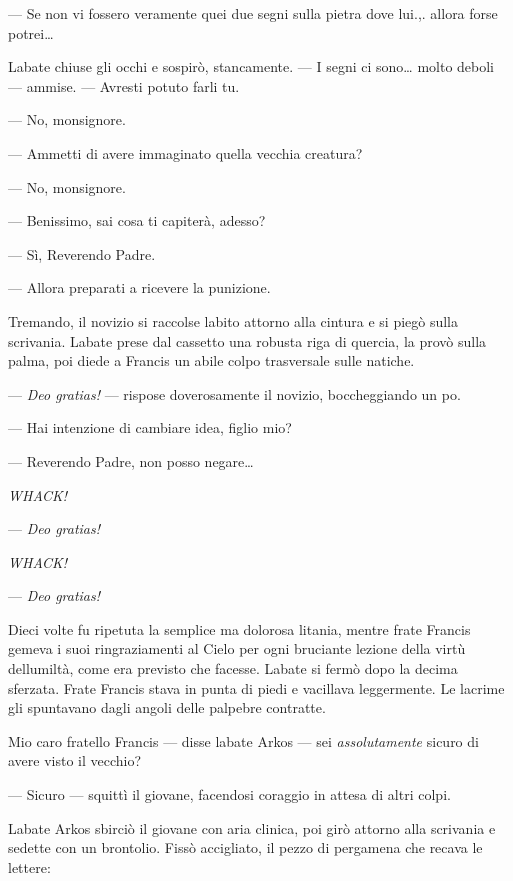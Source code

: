 --- Se non vi fossero veramente quei due segni sulla pietra dove lui.,.
allora forse potrei\ldots{}

L\textquotesingle abate chiuse gli occhi e sospirò, stancamente. --- I
segni ci sono\ldots{} molto deboli --- ammise. --- Avresti potuto farli
tu.

--- No, monsignore.

--- Ammetti di avere immaginato quella vecchia creatura?

--- No, monsignore.

--- Benissimo, sai cosa ti capiterà, adesso?

--- Sì, Reverendo Padre.

--- Allora preparati a ricevere la punizione.

Tremando, il novizio si raccolse l\textquotesingle abito attorno alla
cintura e si piegò sulla scrivania. L\textquotesingle abate prese dal
cassetto una robusta riga di quercia, la provò sulla palma, poi diede a
Francis un abile colpo trasversale sulle natiche.

--- \emph{Deo gratias!} --- rispose doverosamente il novizio,
boccheggiando un po\textquotesingle.

--- Hai intenzione di cambiare idea, figlio mio?

--- Reverendo Padre, non posso negare\ldots{}

\emph{WHACK!}

--- \emph{Deo gratias!}

\emph{WHACK!}

--- \emph{Deo gratias!}

Dieci volte fu ripetuta la semplice ma dolorosa litania, mentre frate
Francis gemeva i suoi ringraziamenti al Cielo per ogni bruciante lezione
della virtù dell\textquotesingle umiltà, come era previsto che facesse.
L\textquotesingle abate si fermò dopo la decima sferzata. Frate Francis
stava in punta di piedi e vacillava leggermente. Le lacrime gli
spuntavano dagli angoli delle palpebre contratte.

Mio caro fratello Francis --- disse l\textquotesingle abate Arkos ---
sei \emph{assolutamente} sicuro di avere visto il vecchio?

--- Sicuro --- squittì il giovane, facendosi coraggio in attesa di altri
colpi.

L\textquotesingle abate Arkos sbirciò il giovane con aria clinica, poi
girò attorno alla scrivania e sedette con un brontolio. Fissò
accigliato, il pezzo di pergamena che recava le lettere:

